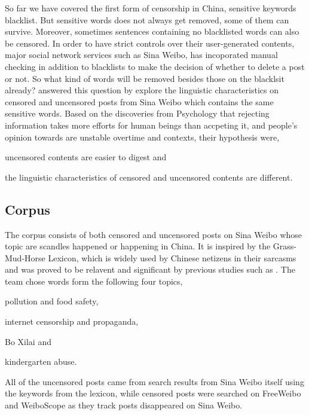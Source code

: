 \documentclass[11pt]{article} %
\begin{document}
So far we have covered the first form of censorship in China, sensitive keywords blacklist. But sensitive words does not always get removed, some of them can survive. Moreover, sometimes sentences containing no blacklisted words can also be censored. In order to have strict controls over their user-generated contents, major social network services such as Sina Weibo, has incoporated manual checking in addition to blacklists to make the decision of whether to delete a post or not. So what kind of words will be removed besides those on the blacklsit already? \cite{ng2018linguistic} answered this question by explore the linguistic characteristics on censored and uncensored posts from Sina Weibo which contains the same sensitive words. Based on the discoveries from Psychology that rejecting information takes more efforts for human beings than accpeting it\cite{lewandowsky2012misinformation}, and people's opinion towards are unstable overtime and contexts\cite{xu2008thinking}, their hypothesis were, \begin {enumerate*}[label=\emph{\alph*})]
\item uncensored contents are easier to digest and \item the linguistic characteristics of censored and uncensored contents are different. 
\end {enumerate*}

\subsection{Corpus}

The corpus consists of both censored and uncensored posts on Sina Weibo whose topic are scandles happened or happening in China. It is inspired by the Grass-Mud-Horse Lexicon, which is widely used by Chinese netizens in their sarcasms and was proved to be relavent and significant by previous studies such as \cite{tang2011symbolic} \cite{wang2012china}. The team chose words form the following four topics,
\begin {enumerate*}[label=\emph{\alph*})]
\item pollution and food safety, \item internet censorship and propaganda, \item Bo Xilai and \item kindergarten abuse.
\end {enumerate*}
All of the uncensored posts came from search results from Sina Weibo itself using the keywords from the lexicon, while censored posts were searched on FreeWeibo and WeiboScope as they track posts disappeared on Sina Weibo.
\end{document}
